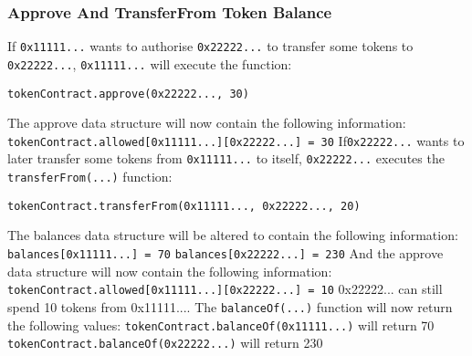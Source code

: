 \subsubsection{Approve And TransferFrom Token Balance}
If \texttt{0x11111...} wants to authorise \texttt{0x22222...} to transfer some tokens to \texttt{0x22222...}, \texttt{0x11111...} will execute the function:
\begin{lstlisting}[language=Solidity]
    tokenContract.approve(0x22222..., 30)
\end{lstlisting}
The approve data structure will now contain the following information:
\newline
\hspace*{4ex} \texttt{tokenContract.allowed[0x11111...][0x22222...] = 30}
\newline
If\texttt{0x22222...} wants to later transfer some tokens from \texttt{0x11111...} to itself, \texttt{0x22222...} executes the \texttt{transferFrom(...)} function:
\begin{lstlisting}[language=Solidity]
    tokenContract.transferFrom(0x11111..., 0x22222..., 20)
\end{lstlisting}
The balances data structure will be altered to contain the following information:
\newline
\hspace*{4ex} \texttt{balances[0x11111...] = 70}
\newline
\hspace*{4ex} \texttt{balances[0x22222...] = 230}
\newline
And the approve data structure will now contain the following information:
\newline
\hspace*{4ex} \texttt{tokenContract.allowed[0x11111...][0x22222...] = 10}
\newline
0x22222... can still spend 10 tokens from 0x11111....
The \texttt{balanceOf(...)} function will now return the following values:
\newline
\hspace*{4ex} \texttt{tokenContract.balanceOf(0x11111...)} will return 70
\newline
\hspace*{4ex} \texttt{tokenContract.balanceOf(0x22222...)} will return 230